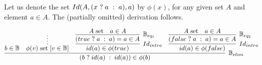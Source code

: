 Let us denote the set $Id(A, (x \; ? \; a \; : \; a), a)$ by $\phi(x)$, for any given set $A$ and
element $a \in A$. The (partially omitted) derivation follows.

\[
\infer[\BB_{elim}]
      {\ite{b}{id(a)}{id(a)} \in \phi(b) }
      { b \in \BB 
      & \infer*{\withhip{v \in \BB}{\isset{\phi(v)}}}{}
      & \infer[Id_{intro}]
              {id(a) \in \phi(true)}
              { \infer[\BB_{eq_1}]
                      {\ite{true}{a}{a} = a \in A}
                      {\isset{A}
                      & a \in A
                      } 
              }
      & \infer[Id_{intro}]
              {id(a) \in \phi(false)}
              { \infer[\BB_{eq_2}]
                      {\ite{false}{a}{a} = a \in A}
                      {\isset{A}
                      & a \in A
                      } 
              }
      }
\] 
